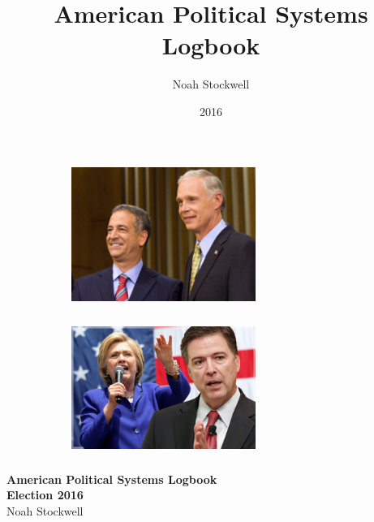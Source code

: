 \documentclass[twoside]{article}
\title{American Political Systems Logbook}
\author{Noah Stockwell}
\date{2016}
\begin{document}
\begin{titlepage}
  \centering
  \centering
  \begin{figure}[H]
    \centering
    \begin{subfigure}{.4\textwidth}
      \centering
      \includegraphics[width=6cm,height=4.5cm]{images/frontpage/Senate.jpg}
      \end{subfigure}%
      \begin{subfigure}{.4\textwidth}
        \centering
        \includegraphics[width=6cm,height=4.5cm]{images/frontpage/Comey.jpg}
      \end{subfigure}%
      \centering
      \vskip3cm
    \end{figure}
    {\bfseries\huge American Political Systems Logbook\\}
    \vskip1cm
    {\bfseries\LARGE Election 2016\\}
    \vskip2cm
    {\huge Noah Stockwell\\}


\end{titlepage}
\end{document}
